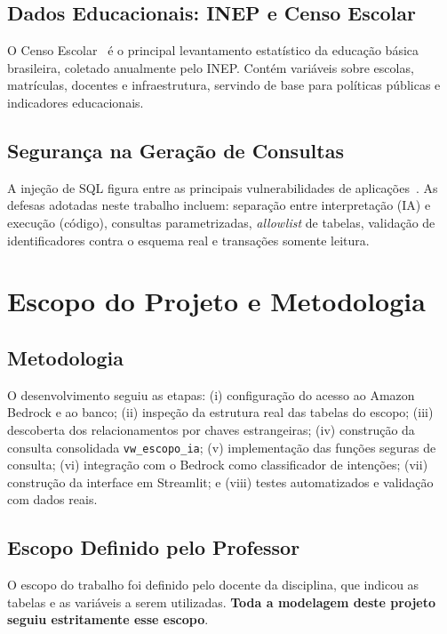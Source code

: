 \documentclass[
    12pt,
    oneside,
    a4paper,
    chapter=TITLE,
    section=TITLE
]{abntex2}
\begin{document}
\section{Dados Educacionais: INEP e Censo Escolar}
O Censo Escolar~\cite{inep_censo} é o principal levantamento estatístico da educação básica
brasileira, coletado anualmente pelo INEP. Contém variáveis sobre escolas, matrículas, docentes e
infraestrutura, servindo de base para políticas públicas e indicadores educacionais.

\section{Segurança na Geração de Consultas}
A injeção de SQL figura entre as principais vulnerabilidades de aplicações~\cite{owasp2021}. As
defesas adotadas neste trabalho incluem: separação entre interpretação (IA) e execução (código),
consultas parametrizadas, \textit{allowlist} de tabelas, validação de identificadores contra o
esquema real e transações somente leitura.

\chapter{Escopo do Projeto e Metodologia}

\section{Metodologia}
O desenvolvimento seguiu as etapas: (i) configuração do acesso ao Amazon Bedrock e ao banco;
(ii) inspeção da estrutura real das tabelas do escopo; (iii) descoberta dos relacionamentos por
chaves estrangeiras; (iv) construção da consulta consolidada \texttt{vw\_escopo\_ia};
(v) implementação das funções seguras de consulta; (vi) integração com o Bedrock como classificador
de intenções; (vii) construção da interface em Streamlit; e (viii) testes automatizados e validação
com dados reais.

\section{Escopo Definido pelo Professor}
O escopo do trabalho foi definido pelo docente da disciplina, que indicou as tabelas e as variáveis
a serem utilizadas. \textbf{Toda a modelagem deste projeto seguiu estritamente esse escopo}.
\end{document}
